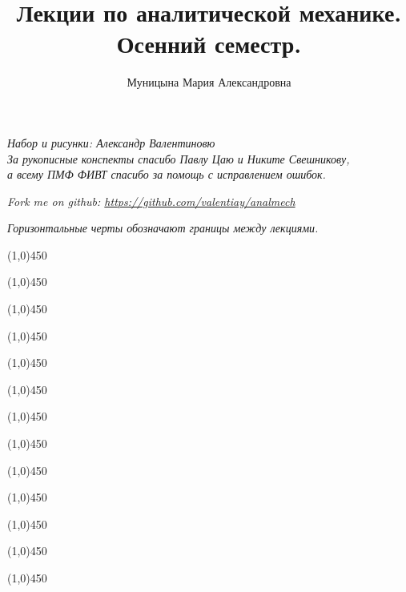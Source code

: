 \documentclass{article}
\date{\displaydate{date}}
\author{Муницына Мария Александровна}
\title{Лекции по аналитической механике. Осенний семестр.}
\newcommand{\lline}{\begin{center}\line(1,0){450}\end{center}}
\begin{document}
  \label{title}
  \vfill
  \begin{titlepage}
  \maketitle
  \begin{center}
  {\itshape\small Набор и рисунки: Александр Валентиновю \\
  За рукописные конспекты спасибо Павлу Цаю и Никите Свешникову, \\ 
  а всему ПМФ ФИВТ спасибо за помощь с исправлением ошибок.}

  \vspace{1em}
  
  {\itshape\small Fork me on github: \url{https://github.com/valentiay/analmech}}
  
  \vspace{1em}
  
  {\itshape\small Горизонтальные черты обозначают границы между лекциями.}
  \vfill

  \end{center}
  \thispagestyle{empty}
  \end{titlepage}

  \pagestyle{fancy}
  \renewcommand{\footrulewidth}{0.2mm}
  \fancyhead{}
  \fancyfoot[C]{\thepage}
  
  \pagebreak
  \tableofcontents
  \pagebreak
  
    \lline
    \lline
    \lline
    \lline
    \lline
    \lline
    \lline
    \lline
    \lline
    \lline
    \lline
    \lline
    \lline
  
\end{document}
